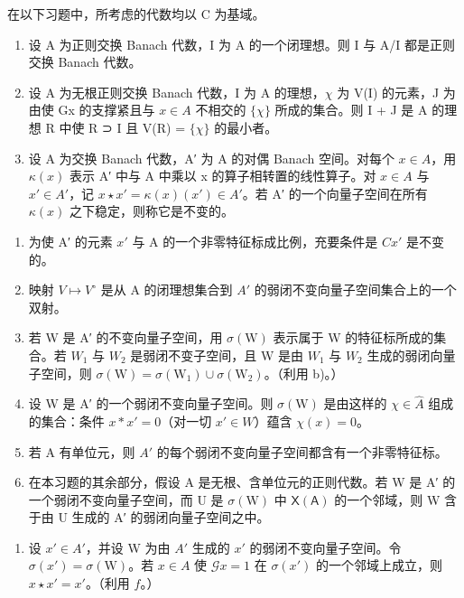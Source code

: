 
在以下习题中，所考虑的代数均以 C 为基域。

\begin{enumerate}
\def\labelenumi{\arabic{enumi})}
\item
  设 A 为正则交换 Banach 代数，I 为 A 的一个闭理想。则 I 与 A/I 都是正则交换 Banach 代数。
\item
  设 A 为无根正则交换 Banach 代数，I 为 A 的理想，\(\chi\) 为 V(I) 的元素，J 为由使 Gx 的支撑紧且与 \(x \in A\) 不相交的 \(\{\chi\}\) 所成的集合。则 I + J 是 A 的理想 R 中使 R ⊃ I 且 V(R) = \(\{\chi\}\) 的最小者。
\item
  设 A 为交换 Banach 代数，A′ 为 A 的对偶 Banach 空间。对每个 \(x \in A\)，用 \(\kappa(x)\) 表示 A′ 中与 A 中乘以 x 的算子相转置的线性算子。对 \(x \in A\) 与 \(x' \in A'\)，记 \(x \star x' = \kappa(x)(x') \in A'\)。若 A′ 的一个向量子空间在所有 \(\kappa(x)\) 之下稳定，则称它是不变的。
\end{enumerate}

\begin{enumerate}
\def\labelenumi{\alph{enumi})}
\item
  为使 A′ 的元素 \(x'\) 与 A 的一个非零特征标成比例，充要条件是 \(Cx'\) 是不变的。
\item
  映射 \(V \mapsto V^{\circ}\) 是从 A 的闭理想集合到 \(A'\) 的弱闭不变向量子空间集合上的一个双射。
\item
  若 W 是 A′ 的不变向量子空间，用 \(\sigma(\mathrm{W})\) 表示属于 W 的特征标所成的集合。若 \(W_{1}\) 与 \(W_{2}\) 是弱闭不变子空间，且 W 是由 \(W_{1}\) 与 \(W_{2}\) 生成的弱闭向量子空间，则 \(\sigma(\mathrm{W}) = \sigma(\mathrm{W}_{1}) \cup \sigma(\mathrm{W}_{2})\)。（利用 b)。）
\item
  设 W 是 A′ 的一个弱闭不变向量子空间。则 \(\sigma(\mathrm{W})\) 是由这样的 \(\chi \in \widehat{A}\) 组成的集合：条件 \(x * x' = 0\)（对一切 \(x' \in W\)）蕴含 \(\chi(x) = 0\)。
\item
  若 A 有单位元，则 \(A'\) 的每个弱闭不变向量子空间都含有一个非零特征标。
\item
  在本习题的其余部分，假设 A 是无根、含单位元的正则代数。若 W 是 A′ 的一个弱闭不变向量子空间，而 U 是 \(\sigma(\mathrm{W})\) 中 \(\mathsf{X}(\mathsf{A})\) 的一个邻域，则 W 含于由 U 生成的 A′ 的弱闭向量子空间之中。
\end{enumerate}

\begin{enumerate}
\def\labelenumi{\alph{enumi})}
\setcounter{enumi}{6}
\tightlist
\item
  设 \(x' \in A'\)，并设 W 为由 \(A'\) 生成的 \(x'\) 的弱闭不变向量子空间。令 \(\sigma(x') = \sigma(\mathrm{W})\)。若 \(x \in A\) 使 \(\mathcal{G}x = 1\) 在 \(\sigma(x')\) 的一个邻域上成立，则 \(x \star x' = x'\)。（利用 \(f\)。）
\end{enumerate}

